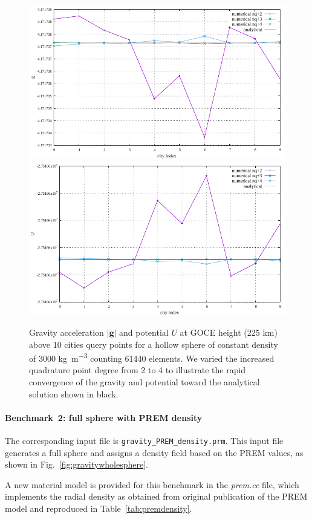 \begin{figure}[h!]
\centering
\includegraphics[width=0.48\linewidth]{../../benchmarks/gravity_prem/doc/cities_gravity_const_g.pdf}
\includegraphics[width=0.48\linewidth]{../../benchmarks/gravity_prem/doc/cities_gravity_const_U.pdf}
\caption{Gravity acceleration $|{\mathbf g}|$ and potential $U$ at GOCE height  (225 \si{km}) above 10 cities query points for a hollow sphere of constant density of 3000 \si{\kilogram\per\cubic\metre} counting 61440 elements. We varied the increased quadrature point degree from 2 to 4 to illustrate the rapid convergence of the gravity and potential toward the analytical solution shown in black.}
\label{fig:gravitycities}
\end{figure}

\paragraph{Benchmark~2: full sphere with PREM density}
\hfill \break
The corresponding input file is \texttt{gravity\_PREM\_density.prm}.
This input file generates a full sphere and assigns a density field based on the PREM values, as shown in Fig.~\ref{fig:gravitywholesphere}.

A new material model is provided for this benchmark in the {\sl prem.cc} file, which implements the radial density as obtained from original publication of the PREM model \cite{dzan81} and reproduced in Table~\ref{tab:premdensity}.

